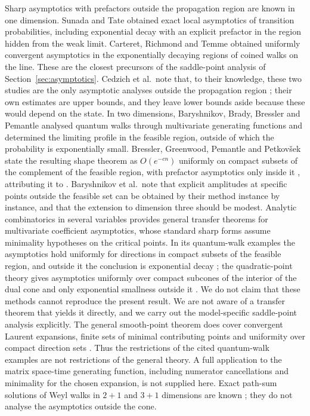 \documentclass[11pt]{amsart}
\theoremstyle{definition}
\theoremstyle{remark}
\begin{document}
Sharp asymptotics with prefactors outside the propagation region are known
in one dimension.  Sunada and Tate \cite{SunadaTate} obtained exact local
asymptotics of transition probabilities, including exponential decay with an
explicit prefactor in the region hidden from the weak limit.  Carteret,
Richmond and Temme \cite{CRT} obtained uniformly convergent asymptotics in
the exponentially decaying regions of coined walks on the line.  These are
the closest precursors of the saddle-point analysis of
Section~\ref{sec:asymptotics}.  Cedzich et al.\ note that, to their
knowledge, these two studies are the only asymptotic analyses outside the
propagation region \cite[Sec.~5.1]{CJWW}; their own estimates are upper
bounds, and they leave lower bounds aside because these would depend on the
state.  In two dimensions, Baryshnikov, Brady,
Bressler and Pemantle \cite{BBBP} analysed quantum walks through multivariate
generating functions and determined the limiting profile in the feasible
region, outside of which the probability is exponentially small.  Bressler,
Greenwood, Pemantle and Petkov\v{s}ek state the resulting shape theorem as
$O(e^{-cn})$ uniformly on compact subsets of the complement of the feasible
region, with prefactor asymptotics only inside it
\cite[Thms.~2.2--2.3]{BGPP}, attributing it to \cite[Thm.~4.2]{BBBP}.
Baryshnikov et al.\ note that explicit amplitudes at specific points outside
the feasible set can be obtained by their method instance by instance, and
that the extension to dimension three should be modest.  Analytic
combinatorics in several variables \cite{ACSV} provides general transfer
theorems for multivariate coefficient asymptotics, whose standard sharp
forms assume minimality hypotheses on the critical points.  In its
quantum-walk examples the asymptotics hold uniformly for directions in
compact subsets of the feasible region, and outside it the conclusion is
exponential decay \cite[Thm.~12.12 and its proof, Thm.~12.14]{ACSVms}; the
quadratic-point theory gives asymptotics uniformly over compact subcones of
the interior of the dual cone and only exponential smallness outside it
\cite[Thm.~3.7]{BP3}.  We do not claim
that these methods cannot reproduce the present result.  We are not aware of
a transfer theorem that yields it directly, and we carry out the
model-specific saddle-point analysis explicitly.
The general smooth-point theorem does cover convergent Laurent expansions,
finite sets of minimal contributing points and uniformity over compact
direction sets \cite[Thms.~9.5 and 9.12, pp.~264--267]{ACSVms}.
Thus the restrictions of the cited quantum-walk examples are not
restrictions of the general theory. A full application to the matrix
space-time generating function, including numerator cancellations and
minimality for the chosen expansion, is not supplied here.
Exact path-sum solutions of Weyl walks in $2+1$ and $3+1$ dimensions are
known \cite{DMPT15,DMPT17}; they do not analyse the asymptotics outside the
cone.
\end{document}
